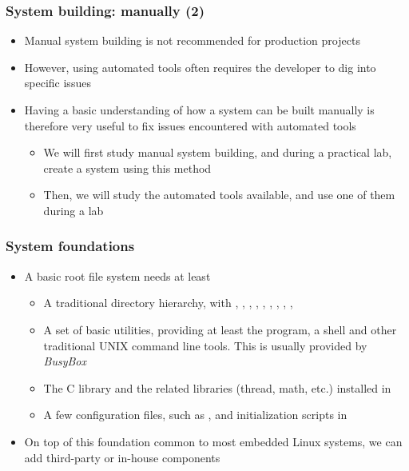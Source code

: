 \begin{frame}
  \frametitle{System building: manually (2)}
  \begin{itemize}
  \item Manual system building is not recommended for production
    projects
  \item However, using automated tools often requires the developer to
    dig into specific issues
  \item Having a basic understanding of how a system can be built
    manually is therefore very useful to fix issues encountered with
    automated tools
    \begin{itemize}
    \item We will first study manual system building, and during a
      practical lab, create a system using this method
    \item Then, we will study the automated tools available, and use
      one of them during a lab
    \end{itemize}
  \end{itemize}
\end{frame}

\begin{frame}
  \frametitle{System foundations}
  \begin{itemize}
  \item A basic root file system needs at least
    \begin{itemize}
    \item A traditional directory hierarchy, with ,
      , , , ,
      , , ,
      , 
    \item A set of basic utilities, providing at least the 
      program, a shell and other traditional UNIX command line
      tools. This is usually provided by {\em BusyBox}
    \item The C library and the related libraries (thread, math, etc.)
      installed in 
    \item A few configuration files, such as , and
      initialization scripts in 
    \end{itemize}
  \item On top of this foundation common to most embedded Linux
    systems, we can add third-party or in-house components
  \end{itemize}
\end{frame}

